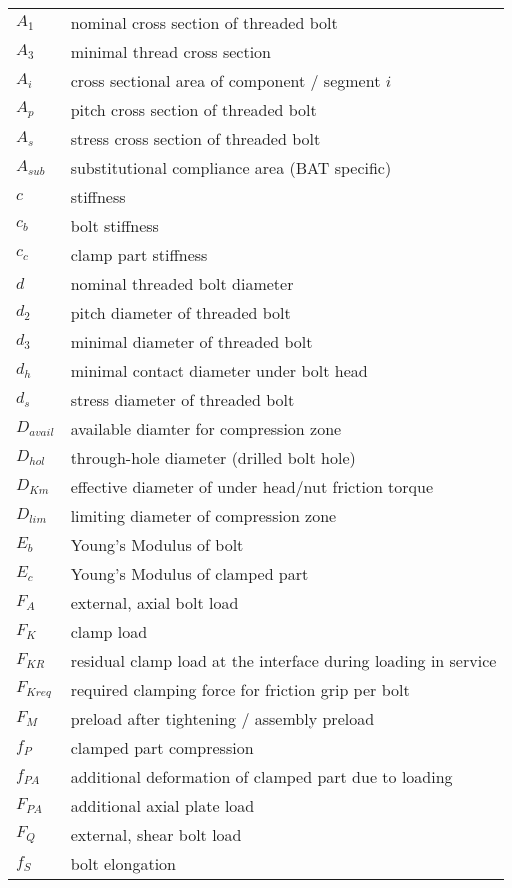 \begin{longtable}{p{2cm} l}
  $A_1$ & nominal cross section of threaded bolt \\
  $A_3$ & minimal thread cross section \\
  $A_i$ & cross sectional area of component / segment $i$ \\
  $A_p$ & pitch cross section of threaded bolt \\
  $A_s$ & stress cross section of threaded bolt \\
  $A_{sub}$ & substitutional compliance area (BAT specific) \\
  $c$ & stiffness \\
  $c_b$ & bolt stiffness \\
  $c_c$ & clamp part stiffness \\
  $d$ & nominal threaded bolt diameter \\
  $d_2$ & pitch diameter of threaded bolt \\
  $d_3$ & minimal diameter of threaded bolt \\
  $d_h$ & minimal contact diameter under bolt head \\
  $d_s$ & stress diameter of threaded bolt \\
  $D_{avail}$ & available diamter for compression zone \\
  $D_{hol}$ & through-hole diameter (drilled bolt hole) \\
  $D_{Km}$ & effective diameter of under head/nut friction torque \\
  $D_{lim}$ & limiting diameter of compression zone \\
  $E_b$ & Young's Modulus of bolt \\
  $E_c$ & Young's Modulus of clamped part \\
  $F_A$ & external, axial bolt load \\
  $F_K$ & clamp load \\
  $F_{KR}$ & residual clamp load at the interface during loading in service \\
  $F_{Kreq}$ & required clamping force for friction grip per bolt \\
  $F_M$ & preload after tightening / assembly preload \\
  $f_P$ & clamped part compression \\
  $f_{PA}$ & additional deformation of clamped part due to loading \\
  $F_{PA}$ & additional axial plate load \\
  $F_Q$ & external, shear bolt load \\
  $f_S$ & bolt elongation \\

\end{longtable}
